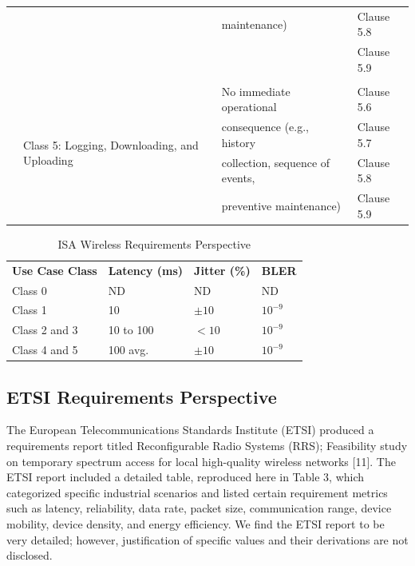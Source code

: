\begin{table}[!tb]
\begin{adjustbox}{width=\columnwidth,center}
\begin{tabular}{|l|l|p{10.645em}|p{10em}|}
		&       & maintenance)  & Clause 5.8  \\
		&       & \multicolumn{1}{l|}{} & Clause 5.9  \\
		&       & \multicolumn{1}{l|}{} & \multicolumn{1}{l|}{} \\
		\cmidrule{2-4}      & \multicolumn{1}{l|}{\multirow{4}[2]{*}{Class 5:  Logging, Downloading, and Uploading}} & No immediate operational  & Clause 5.6  \\
		&       & consequence (e.g., history  & Clause 5.7  \\
		&       & collection, sequence of events,  & Clause 5.8  \\
		&       & preventive maintenance)  & Clause 5.9  \\
		\bottomrule
	\end{tabular}%

	\end{adjustbox}

	\label{soa:isa-classes}%
\end{table}%


\begin{table}[!tb]
	\centering
	\caption{ISA Wireless Requirements Perspective}
	\label{soa:isa-reqts-persp}%

	\begin{tabular}{|p{10.57em}|p{5.855em}|p{5.855em}|p{5.855em}|}
		\toprule
		\textbf{Use Case Class} & \textbf{Latency (ms)} & \textbf{Jitter (\%)} & \textbf{BLER} \\
		Class 0 & ND    & ND    & ND \\
		\midrule
		Class 1 & \multicolumn{1}{l|}{10} & $\pm10$ & $10^{-9}$ \\
		\midrule
		Class 2 and 3 & 10 to 100 & $<10$ & $10^{-9}$ \\
		\midrule
		Class 4 and 5 & 100 avg. & $\pm10$ & $10^{-9}$ \\
		\bottomrule
	\end{tabular}%
\end{table}%


\subsection{ETSI Requirements Perspective}\label{sec:litreview:etsi}

The European Telecommunications Standards Institute (ETSI) produced a requirements report titled Reconfigurable Radio Systems (RRS); Feasibility study on temporary spectrum access for local high-quality wireless networks [11]. The ETSI report included a detailed table, reproduced here in Table 3, which categorized specific industrial scenarios and listed certain requirement metrics such as latency, reliability, data rate, packet size, communication range, device mobility, device density, and energy efficiency. We find the ETSI report to be very detailed; however, justification of specific values and their derivations are not disclosed.

